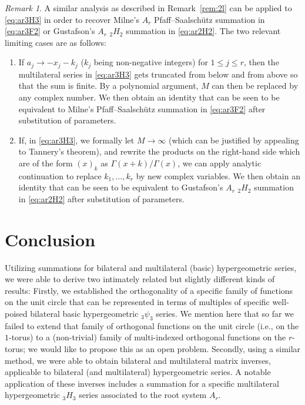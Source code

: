 \documentclass[reqno,12pt]{amsart}
\theoremstyle{remark}
\newtheorem{remark}{Remark}
\numberwithin{equation}{section}
\newcommand{\Ga}{\Gamma}
\begin{document}
\begin{remark}
A similar analysis as described in Remark~\ref{rem:2l} can be applied to
\eqref{eq:ar3H3} in order to recover Milne's $A_r$
Pfaff--Saalsch\"utz summation in \eqref{eq:ar3F2}
or Gustafson's $A_r$ $_2H_2$ summation in \eqref{eq:ar2H2}.
The two relevant limiting cases are as follows:
\begin{enumerate}
\item
  If $a_j\to -x_j-k_j$ ($k_j$ being non-negative integers) for $1\le j\le r$,
then the multilateral series in \eqref{eq:ar3H3}
gets truncated from below and from above so that the sum is finite. By
a polynomial argument, $M$ can then be replaced by any complex number.
We then obtain an identity that can be seen to be equivalent to Milne's
Pfaff--Saalsch\"utz summation in \eqref{eq:ar3F2} after
substitution of parameters.

\item
  If, in \eqref{eq:ar3H3}, we formally let $M\to\infty$
  (which can be justified by appealing to Tannery's theorem),
  and rewrite the products on the right-hand side which are of the
  form $(x)_k$ as $\Ga(x+k)/\Ga(x)$, we can apply analytic continuation
to replace $k_1,\ldots,k_r$ by new complex variables. We then obtain
an identity that can be seen to be equivalent to Gustafson's
$A_r$ ${}_2H_2$ summation in \eqref{eq:ar2H2} after
substitution of parameters.
\end{enumerate}

\end{remark}

\section{Conclusion}\label{sec:con}
Utilizing summations for bilateral and multilateral (basic)
hypergeometric series, we were able to derive two intimately related
but slightly different kinds of results: Firstly, we established
the orthogonality of a specific family of functions on the unit circle
that can be represented in terms of multiples of specific well-poised
bilateral basic hypergeometric $_3\psi_3$ series.
We mention here that so far we failed to extend that
family of orthogonal functions on the unit circle
(i.e., on the $1$-torus) to a (non-trivial) family of multi-indexed
orthogonal functions on the $r$-torus; we would like to propose this
as an open problem.
Secondly, using a similar method, we were able to
obtain bilateral and multilateral matrix inverses,
applicable to bilateral (and multilateral) hypergeometric series.
A notable application of these inverses includes a summation for
a specific multilateral hypergeometric $_3H_3$ series associated
to the root system $A_r$.
\end{document}

